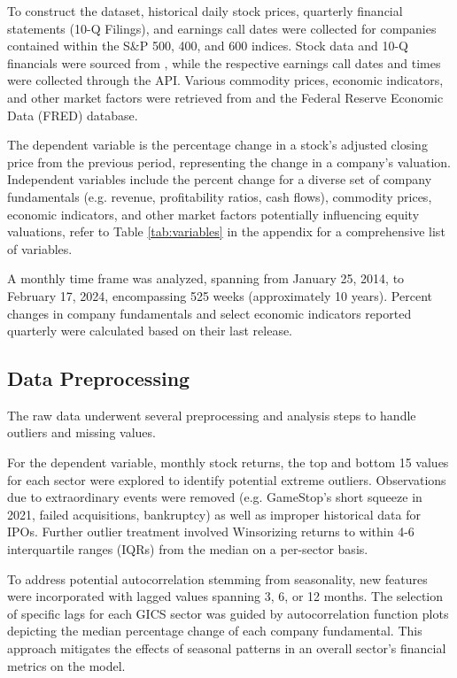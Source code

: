 \documentclass[12pt,a4paper,english]{article}
\begin{document}
To construct the dataset, historical daily stock prices, quarterly financial statements (10-Q Filings), and earnings call dates were collected for companies contained within the S\&P 500, 400, and 600 indices. Stock data and 10-Q financials were sourced from \citeauthor{yahoofinance}, while the respective earnings call dates and times were collected through the \citeauthor{stocktwits} API. Various commodity prices, economic indicators, and other market factors were retrieved from \citeauthor{yahoofinance} and the Federal Reserve Economic Data (FRED) database.

The dependent variable is the percentage change in a stock's adjusted closing price from the previous period, representing the change in a company's valuation. Independent variables include the percent change for a diverse set of company fundamentals (e.g. revenue, profitability ratios, cash flows), commodity prices, economic indicators, and other market factors potentially influencing equity valuations, refer to Table \ref{tab:variables} in the appendix for a comprehensive list of variables.

A monthly time frame was analyzed, spanning from January 25, 2014, to February 17, 2024, encompassing 525 weeks (approximately 10 years). Percent changes in company fundamentals and select economic indicators reported quarterly were calculated based on their last release.

\subsection{Data Preprocessing}

The raw data underwent several preprocessing and analysis steps to handle outliers and missing values.

For the dependent variable, monthly stock returns, the top and bottom 15 values for each sector were explored to identify potential extreme outliers. Observations due to extraordinary events were removed (e.g. GameStop's short squeeze in 2021, failed acquisitions, bankruptcy) as well as improper historical data for IPOs. Further outlier treatment involved Winsorizing returns to within 4-6 interquartile ranges (IQRs) from the median on a per-sector basis.

To address potential autocorrelation stemming from seasonality, new features were incorporated with lagged values spanning 3, 6, or 12 months. The selection of specific lags for each GICS sector was guided by autocorrelation function plots depicting the median percentage change of each company fundamental. This approach mitigates the effects of seasonal patterns in an overall sector's financial metrics on the model.
\end{document}
